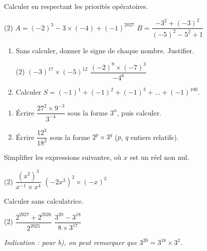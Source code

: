 \documentclass[a4paper,11pt,fleqn]{article}
\begin{document}

\begin{EXO}{}{}
Calculer en respectant les priorités opératoires.

\begin{tasks}(2)
	\task $A=(-2)^3-3\times(-4)+(-1)^{2027}$
	\task $B=\dfrac{-3^2+(-3)^2}{(-5)^2-5^2+1}$
\end{tasks}
\end{EXO}

\begin{EXO}{}{}
\begin{enumerate}
	\item Sans calculer, donner le signe de chaque nombre. Justifier.
	\begin{tasks}(2)
		\task $(-3)^{17}\times(-5)^{12}$
		\task $\dfrac{(-2)^{9}\times(-7)^{3}}{-4^{6}}$
	\end{tasks}
	\item Calculer $S=(-1)^1+(-1)^2+(-1)^3+\dots+(-1)^{100}$.
\end{enumerate}
\end{EXO}

\begin{EXO}{}{}
\begin{enumerate}
	\item Écrire $\dfrac{27^2\times 9^{-3}}{3^{-4}}$ sous la forme $3^n$, puis calculer.
	\item Écrire $\dfrac{12^{3}}{18^{2}}$ sous la forme $2^p\times 3^q$ ($p$, $q$ entiers relatifs).
\end{enumerate}
\end{EXO}

\begin{EXO}{}{}
Simplifier les expressions suivantes, où $x$ est un réel non nul.

\begin{tasks}(2)
	\task $\dfrac{\left(x^2\right)^3}{x^{-1}\times x^4}$
	\task $\left(-2x^3\right)^2\times(-x)^3$
\end{tasks}
\end{EXO}

\begin{EXO}{}{}
Calculer sans calculatrice.

\begin{tasks}(2)
	\task $\dfrac{2^{2027}+2^{2026}}{2^{2025}}$
	\task $\dfrac{3^{20}-3^{18}}{8\times 3^{17}}$
\end{tasks}

\textit{Indication : pour b), on peut remarquer que $3^{20}=3^{18}\times 3^2$.}
\end{EXO}
\end{document}
